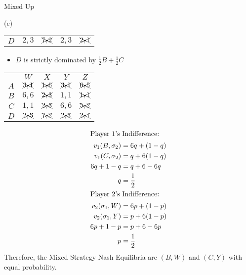 \documentclass[8pt]{extarticle}
\begin{document}
\begin{problem}{Mixed Up}
\begin{problem}{(c)}
\begin{center}
\begin{tabular}{c|c|c|c|c|}
            \cline{2-5}
            $D$ & $2,3$ & $\xcancel{7,2}$ & $2,3$ & $\xcancel{2,1}$\\
            \cline{2-5}
          \end{tabular}
        \end{center}
        \begin{itemize}
          \item $D$ is strictly dominated by $\frac{1}{2}B + \frac{1}{2}C$
        \end{itemize}
        \begin{center}
          \small
          \renewcommand{\arraystretch}{1.5}
          \begin{tabular}{c|c|c|c|c|}
            \multicolumn{1}{c}{} & \multicolumn{1}{c}{$W$} & \multicolumn{1}{c}{$X$} & \multicolumn{1}{c}{$Y$} & \multicolumn{1}{c}{$Z$}\\
            \cline{2-5}
            $A$ & $\xcancel{3,1}$ & $\xcancel{1,6}$ & $\xcancel{3,1}$ & $\xcancel{6,5}$ \\
            \cline{2-5}
            $B$ & $6,6$ & $\xcancel{2,3}$ & $1,1$ & $\xcancel{1,1}$ \\
            \cline{2-5}
            $C$ & $1,1$ & $\xcancel{2,3}$ & $6,6$ & $\xcancel{5,2}$ \\
            \cline{2-5}
            $D$ & $\xcancel{2,3}$ & $\xcancel{7,2}$ & $\xcancel{2,3}$ & $\xcancel{2,1}$\\
            \cline{2-5}
          \end{tabular}
        \end{center}
      \begin{align*}
        \shortintertext{Player 1's Indifference:}
        v_1(B,\sigma_2) &= 6q + (1-q)\\
        v_1(C,\sigma_2) &= q + 6(1-q)\\
        6q + 1 - q &= q + 6 - 6q\\
        q &= \frac{1}{2}\\
        \shortintertext{Player 2's Indifference:}
        v_2(\sigma_1,W) &= 6p + (1-p)\\
        v_2(\sigma_1,Y) &= p + 6(1-p)\\
        6p + 1 - p &= p + 6 - 6p\\
        p &= \frac{1}{2}
      \end{align*}
      Therefore, the Mixed Strategy Nash Equilibria are $(B,W)$ and $(C,Y)$ with equal probability.
    \end{problem}
  \end{problem}
\end{document}
